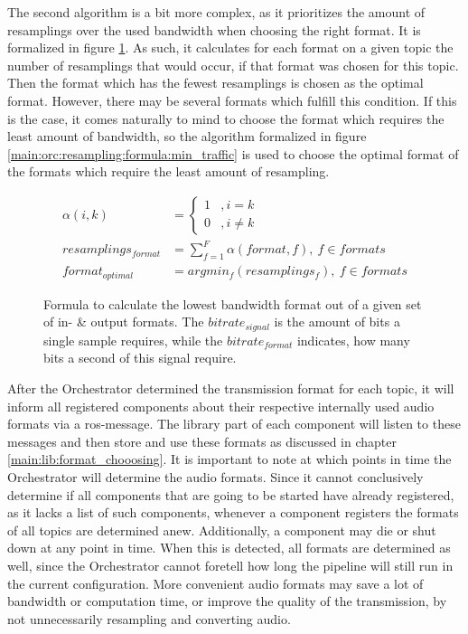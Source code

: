 The second algorithm is a bit more complex, as it prioritizes the amount of resamplings over the used bandwidth when choosing the right format.
It is formalized in figure \ref{main:orc:resampling:formula:min_cpu}.
As such, it calculates for each format on a given topic the number of resamplings that would occur, if that format was chosen for this topic.
Then the format which has the fewest resamplings is chosen as the optimal format.
However, there may be several formats which fulfill this condition.
If this is the case, it comes naturally to mind to choose the format which requires the least amount of bandwidth, so the algorithm formalized in figure \ref{main:orc:resampling:formula:min_traffic} is used to choose the optimal format of the formats which require the least amount of resampling.

\begin{figure}
	\begin{align*}
	\alpha(i,k) &=
	\begin{cases}
	1 & , i = k \\
	0 & , i \neq k
	\end{cases} \\[10pt]
	resamplings_{format} &= \sum_{f=1}^{F} \alpha(format, f) ,\ f \in formats\\[10pt]
	format_{optimal} &= argmin_{f}(resamplings_{f}) , \ f \in formats
	\end{align*}
	\caption{Formula to calculate the lowest bandwidth format out of a given set of in- \& output formats.
		The $bitrate_{signal}$ is the amount of bits a single sample requires, while the $bitrate_{format}$ indicates, how many bits a second of this signal require.}
	\label{main:orc:resampling:formula:min_cpu}
\end{figure}

After the Orchestrator determined the transmission format for each topic, it will inform all registered components about their respective internally used audio formats via a \gls{ros}-message.
The library part of each component will listen to these messages and then store and use these formats as discussed in chapter \ref{main:lib:format_chooosing}.
It is important to note at which points in time the Orchestrator will determine the audio formats.
Since it cannot conclusively determine if all components that are going to be started have already registered, as it lacks a list of such components, whenever a component registers the formats of all topics are determined anew.
Additionally, a component may die or shut down at any point in time.
When this is detected, all formats are determined as well, since the Orchestrator cannot foretell how long the pipeline will still run in the current configuration.
More convenient audio formats may save a lot of bandwidth or computation time, or improve the quality of the transmission, by not unnecessarily resampling and converting audio.  


